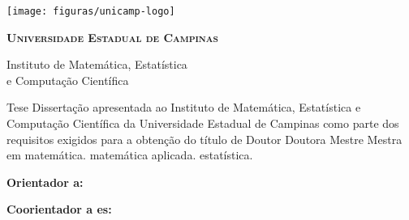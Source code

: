 \thispagestyle{plain}
\texttt{[image: figuras/unicamp-logo]}
\begin{center}
  {\large\textbf{\textsc{Universidade Estadual de Campinas}}
  \vspace{.5cm}

  Instituto de Matemática, Estatística \\
  e Computação Científica}
\end{center}
\vfill
\begin{center}
  {\large\textbf{\textsc{\autor}}}
\end{center}
\vfill
\begin{center}
  {\Large\textbf{\textsc{\titulo}}}
\end{center}
\vfill

\begin{flushright}
  \begin{minipage}[c]{.5\textwidth}
    \ifx\mestrado\undefined
    Tese
    \else
    Dissertação
    \fi
    apresentada ao Instituto de Matemática,
    Estatística e Computação Científica da Universidade
    Estadual de Campinas como parte dos requisitos exigidos
    para a obtenção do título de
    \ifx\mestrado\undefined
    \ifx\femaleAuthor\undefined
    Doutor
    \else
    Doutora
    \fi
    \else
    \ifx\femaleAuthor\undefined
    Mestre
    \else
    Mestra
    \fi
    \fi
    em
    \ifx\matematica\undefined
    \else
    matemática.
    \fi
    \ifx\aplicada\undefined
    \else
    matemática aplicada.
    \fi
    \ifx\estatistica\undefined
    \else
    estatística.
    \fi
  \end{minipage}
\end{flushright}
\vspace{.5cm}

\noindent
\textbf{Orientador\ifx\femaleOrientador\undefined
\else
a\fi: \orientador
}
\vspace{.25cm}

\ifx\coorientador\undefined
\else
\noindent
\textbf{Coorientador\ifx\femaleCoorientador\undefined
\else
a\fi\ifx\Coorientadores\undefined
\else
es\fi: \coorientador
}
\vspace{.5cm}
\fi


